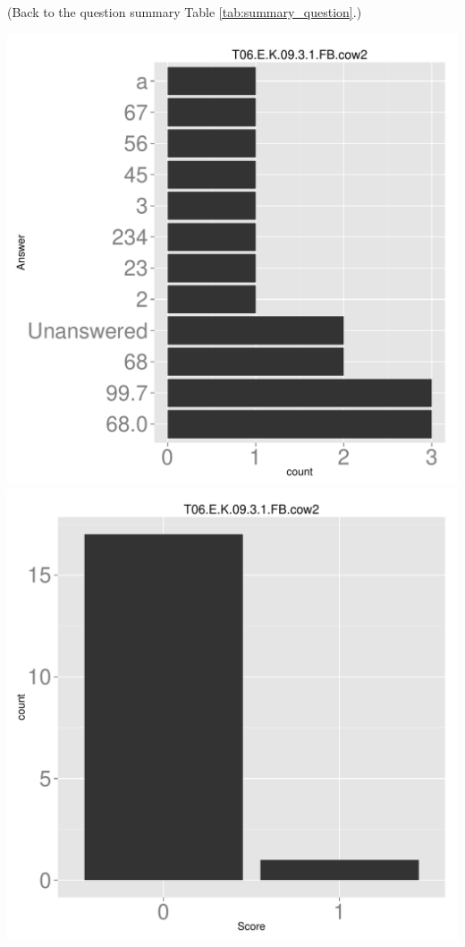 \documentclass[12pt,english,nohyper]{tufte-handout}\usepackage[]{graphicx}\usepackage[]{color}
\begin{document}
 (Back to the question summary Table \ref{tab:summary_question}.)

\begin{center} \includegraphics[width=.45\linewidth]{Topic06_AB_31_answer} \includegraphics[width=.45\linewidth]{Topic06_AB_31_score} \end{center} 
\end{document}
